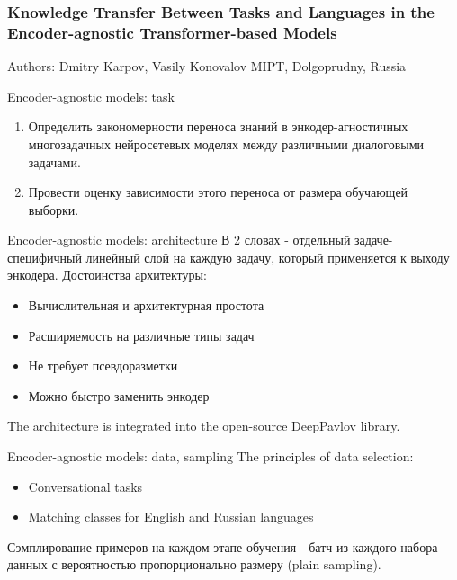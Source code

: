 \begin{frame}
    \setcounter{framenumber}{1}
    \frametitle{Knowledge Transfer Between Tasks and Languages in the Encoder-agnostic Transformer-based Models}
    Authors: Dmitry Karpov, Vasily Konovalov
    MIPT, Dolgoprudny, Russia
    
\end{frame}



\begin{frame}{Encoder-agnostic models: task}
\begin{enumerate}
    \item Определить закономерности переноса знаний в энкодер-агностичных многозадачных нейросетевых моделях между различными диалоговыми задачами.
    \item Провести оценку зависимости этого переноса от размера обучающей выборки.
 \end{enumerate}
\end{frame}

\begin{frame}{Encoder-agnostic models: architecture}
В 2 словах - отдельный задаче-специфичный линейный слой на каждую задачу, который применяется к выходу энкодера.
Достоинства архитектуры:
\begin{itemize}
  \item Вычислительная и архитектурная простота
  \item Расширяемость на различные типы задач
  \item Не требует псевдоразметки
  \item Можно быстро заменить энкодер
\end{itemize}
The architecture is integrated into the open-source DeepPavlov library.
\end{frame}

\begin{frame}{Encoder-agnostic models: data, sampling}
The principles of data selection:
\begin{itemize}
    \item Conversational tasks
    \item Matching classes for English and Russian languages
\end{itemize}
Сэмплирование примеров на каждом этапе обучения - батч из каждого набора данных с вероятностью пропорционально размеру (plain sampling).
\end{frame}

